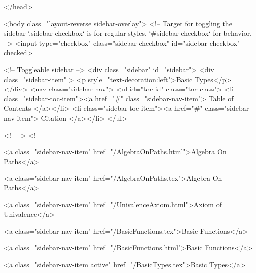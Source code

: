   
</head>




  <body class="layout-reverse sidebar-overlay">
    <!-- Target for toggling the sidebar `.sidebar-checkbox` is for regular
     styles, `#sidebar-checkbox` for behavior. -->
<input type="checkbox" class="sidebar-checkbox" id="sidebar-checkbox" checked>

<!-- Toggleable sidebar -->
<div class="sidebar" id="sidebar">
  <div class="sidebar-item" >
    <p style="text-decoration:left">Basic Types</p>
  </div>
  <nav class="sidebar-nav">
    <ul id="toc-id" class="toc-class">
  <li class="sidebar-toc-item"><a href="#" class="sidebar-nav-item"> Table of Contents </a></li>
  <li class="sidebar-toc-item"><a href="#" class="sidebar-nav-item"> Citation </a></li>
</ul>


    <!--  -->
    <!-- 
      
    
      
    
      
    
      
        
      
    
      
        
          <a class="sidebar-nav-item" href="/AlgebraOnPaths.html">Algebra On Paths</a>
        
      
    
      
        
          <a class="sidebar-nav-item" href="/AlgebraOnPaths.tex">Algebra On Paths</a>
        
      
    
      
        
          <a class="sidebar-nav-item" href="/UnivalenceAxiom.html">Axiom of Univalence</a>
        
      
    
      
        
          <a class="sidebar-nav-item" href="/BasicFunctions.tex">Basic Functions</a>
        
      
    
      
        
          <a class="sidebar-nav-item" href="/BasicFunctions.html">Basic Functions</a>
        
      
    
      
        
          <a class="sidebar-nav-item active" href="/BasicTypes.tex">Basic Types</a>
        
      
    
      
        
